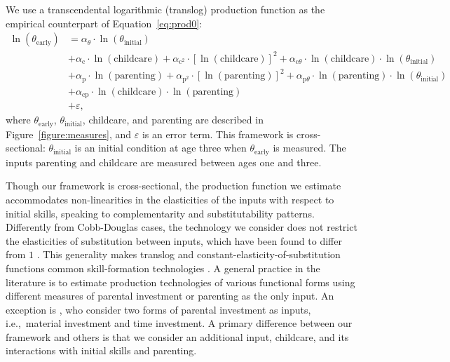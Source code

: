 We use a transcendental logarithmic (translog) production function as the empirical counterpart of  Equation~\eqref{eq:prod0}: 
\begin{align}
\ln \left( \theta_{\text{early}} \right) &= \alpha_{\theta} \cdot  \ln \left( \theta_{\text{initial}} \right)  \label{eq:prod} \\
	    &+ \alpha_{\text{c}} \cdot {\ln \left( \text{childcare} \right)} + \alpha_{\text{c}^2} \cdot \left[ {\ln \left( \text{childcare} \right)} \right]^2 + \alpha_{\text{c}\theta} \cdot {\ln \left( \text{childcare}  \right)} \cdot \ln {\left( \theta_{\text{initial}} \right)} \nonumber \\
	    &+ \alpha_{\text{p}} \cdot {\ln \left( \text{parenting} \right)} + \alpha_{\text{p}^2} \cdot \left[ {\ln \left( \text{parenting} \right)} \right]^2 + \alpha_{\text{p}\theta} \cdot {\ln \left( \text{parenting}  \right)} \cdot \ln {\left( \theta_{\text{initial}} \right)} \nonumber \\
	    	    &+ \alpha_{\text{cp}} \cdot {\ln \left( \text{childcare} \right)} \cdot {\ln \left( \text{parenting} \right)} \nonumber \\
	    & +  \varepsilon, \nonumber 
\end{align}
\noindent where $\theta_{\text{early}}$, $\theta_{\text{initial}}$, childcare, and parenting are described in Figure~\ref{figure:measures}, and $\varepsilon$ is an error term. This framework is cross-sectional: $\theta_{\text{initial}}$ is an initial condition at age three when $\theta_{\text{early}}$ is measured. The inputs $\text{parenting}$ and $\text{childcare}$ are measured between ages one and three. 

Though our framework is cross-sectional, the production function we estimate accommodates non-linearities in the elasticities of the inputs with respect to initial skills, speaking to complementarity and substitutability patterns. Differently from Cobb-Douglas cases, the technology we consider does not restrict the elasticities of substitution between inputs, which have been found to differ from $1$ \citep[e.g.,][]{cunhaEstimatingTechnologyCognitive2010a}. This generality makes translog and constant-elasticity-of-substitution functions common skill-formation technologies \citep[e.g.,][]{cunhaEstimatingTechnologyCognitive2010a,agostinelliEstimatingTechnologyChildren2016a,delbonoIdentificationDynamicLatent2022}. A general practice in the literature is to estimate production technologies of various functional forms using different measures of parental investment or parenting as the only input. An exception is \citet{attanasioEstimatingProductionFunction2020b}, who consider two forms of parental investment as inputs, i.e.,\ material investment and time investment. A primary difference between our framework and others is that we consider an additional input, childcare, and its interactions with initial skills and parenting.

